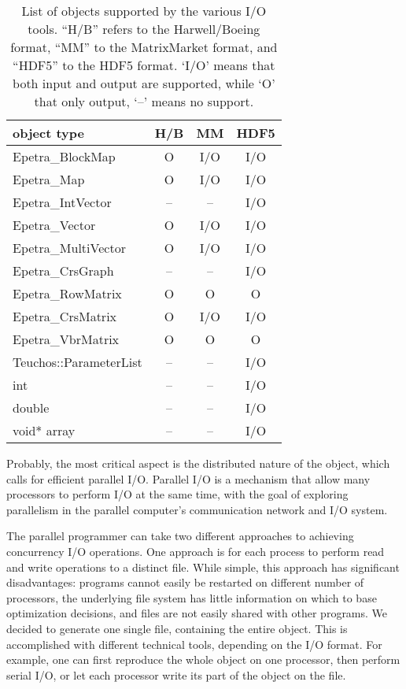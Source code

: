 \documentclass[11pt,relax]{SANDreport}
\begin{document}
\begin{table}
\begin{center}
\begin{tabular}{|l | c | c | c |}
\hline
object type           & H/B       & MM        & HDF5 \\
\hline
Epetra\_BlockMap      & O  & I/O & I/O \\
Epetra\_Map           & O  & I/O & I/O \\
Epetra\_IntVector     & -- & --  & I/O \\
Epetra\_Vector        & O  & I/O & I/O \\
Epetra\_MultiVector   & O  & I/O & I/O \\
Epetra\_CrsGraph      & -- & --  & I/O \\
Epetra\_RowMatrix     & O  &   O &   O \\
Epetra\_CrsMatrix     & O  & I/O & I/O \\
Epetra\_VbrMatrix     & O  &   O &   O \\
Teuchos::ParameterList& -- & --  & I/O \\
int                   & -- & --  & I/O \\
double                & -- & --  & I/O \\
void* array           & -- & --  & I/O \\
\hline
\end{tabular}
\caption{List of objects supported by the various I/O tools. ``H/B'' refers to
  the Harwell/Boeing format, ``MM'' to the MatrixMarket format, and ``HDF5''
    to the HDF5 format. `I/O' means that both input and output are supported,
       while `O' that only output, `--' means no support.}
\label{tab:supported}
\end{center}
\end{table}

Probably, the most critical aspect is the distributed nature of the object,
  which calls for efficient parallel I/O.
Parallel I/O is a mechanism that allow many
processors to perform I/O at the same time, with the goal of exploring
parallelism in the parallel computer's communication network and I/O system.

The parallel programmer can take two different approaches to achieving
concurrency I/O operations. One approach is for each process to perform read
and write operations to a distinct file. While simple, this approach has
significant disadvantages: programs cannot easily be restarted on different
number of processors, the underlying file system has little information on
which to base optimization decisions, and files are not easily shared with
other programs. We decided to generate one single file, containing the entire
object. This is accomplished with different technical tools, depending on the
I/O format. For example, one can first reproduce the whole object on one
processor, then perform serial I/O, or let each processor write its part of
the object on the file. 
\end{document}
